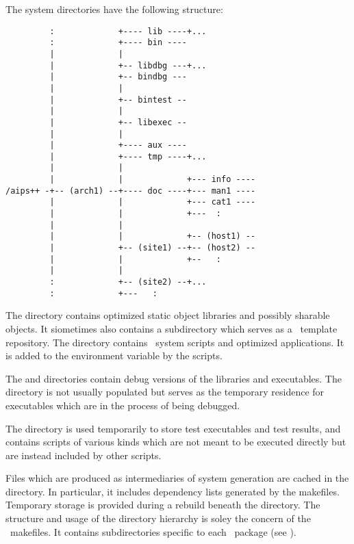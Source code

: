 The system directories have the following structure:

\begin{verbatim}
         :             +---- lib ----+...
         :             +---- bin ----
         |             |
         |             +-- libdbg ---+...
         |             +-- bindbg ---
         |             |
         |             +-- bintest --
         |             |
         |             +-- libexec --
         |             |
         |             +---- aux ----
         |             +---- tmp ----+...
         |             |
         |             |             +--- info ----
/aips++ -+-- (arch1) --+---- doc ----+--- man1 ----
         |             |             +--- cat1 ----
         |             |             +---  :
         |             |
         |             |             +-- (host1) --
         |             +-- (site1) --+-- (host2) --
         |             |             +--   :
         |             |
         :             +-- (site2) --+...
         :             +---   :
\end{verbatim}

\noindent
The  directory contains optimized static object libraries and
possibly sharable objects.  It siometimes also contains a subdirectory which
serves as a \cplusplus\ template repository.  The  directory
contains \aipspp\ system scripts and optimized applications.  It is added to
the  environment variable by the  scripts.

The  and  directories contain debug versions of the
libraries and executables.  The  directory is not usually
populated but serves as the temporary residence for executables which are in
the process of being debugged.

The  directory is used temporarily to store test executables and
test results, and  contains scripts of various kinds which are
not meant to be executed directly but are instead included by other scripts.

Files which are produced as intermediaries of system generation are cached in
the  directory.  In particular, it includes dependency lists
generated by the makefiles.  Temporary storage is provided during a rebuild
beneath the  directory.  The structure and usage of the 
directory hierarchy is soley the concern of the \aipspp\ makefiles.  It
contains subdirectories specific to each \aipspp\ package (see
).


